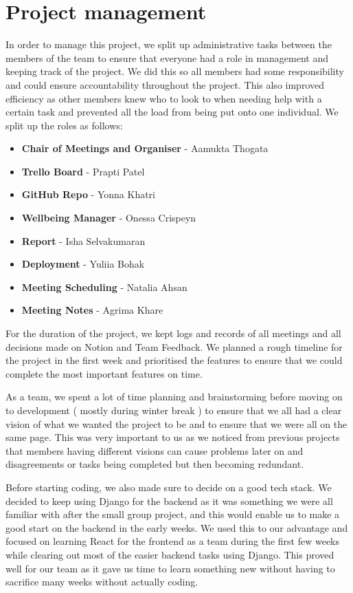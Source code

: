 \chapter{Project management}
\label{chap:project-management}

In order to manage this project, we split up administrative tasks between the members of the team to ensure that everyone had a role in management and keeping track of the project. We did this so all members had some responsibility and could ensure accountability throughout the project. This also improved efficiency as other members knew who to look to when needing help with a certain task and prevented all the load from being put onto one individual. We split up the roles as follows:

\begin{itemize}
    \item \textbf{Chair of Meetings and Organiser} - Aamukta Thogata
    \item \textbf{Trello Board} - Prapti Patel
    \item \textbf{GitHub Repo} - Yonna Khatri
    \item \textbf{Wellbeing Manager} - Onessa Crispeyn
    \item \textbf{Report} - Isha Selvakumaran
    \item \textbf{Deployment} - Yuliia Bohak
    \item \textbf{Meeting Scheduling} - Natalia Ahsan
    \item \textbf{Meeting Notes} - Agrima Khare
\end{itemize}

For the duration of the project, we kept logs and records of all meetings and all decisions made on Notion and Team Feedback. We planned a rough timeline for the project in the first week and prioritised the features to ensure that we could complete the most important features on time. 

As a team, we spent a lot of time planning and brainstorming before moving on to development ( mostly during winter break ) to ensure that we all had a clear vision of what we wanted the project to be and to ensure that we were all on the same page. This was very important to us as we noticed from previous projects that members having different visions can cause problems later on and disagreements or tasks being completed but then becoming redundant.

Before starting coding, we also made sure to decide on a good tech stack. We decided to keep using Django for the backend as it was something we were all familiar with after the small group project, and this would enable us to make a good start on the backend in the early weeks. We used this to our advantage and focused on learning React for the frontend as a team during the first few weeks while clearing out most of the easier backend tasks using Django. This proved well for our team as it gave us time to learn something new without having to sacrifice many weeks without actually coding.


